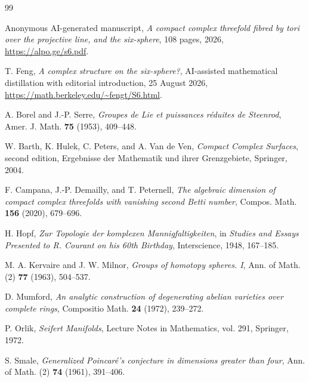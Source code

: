 \documentclass[11pt,reqno]{amsart}
\numberwithin{equation}{section}
\theoremstyle{definition}
\begin{document}
\begin{thebibliography}{99}

Anonymous AI-generated manuscript,
\emph{A compact complex threefold fibred by tori over the projective line, and the six-sphere},
108 pages, 2026,
\url{https://alpo.ge/s6.pdf}.

T. Feng,
\emph{A complex structure on the six-sphere?},
AI-assisted mathematical distillation with editorial introduction, 25 August 2026,
\url{https://math.berkeley.edu/~fengt/S6.html}.

A. Borel and J.-P. Serre,
\emph{Groupes de Lie et puissances r\'eduites de Steenrod},
Amer. J. Math. \textbf{75} (1953), 409--448.

W. Barth, K. Hulek, C. Peters, and A. Van de Ven,
\emph{Compact Complex Surfaces}, second edition,
Ergebnisse der Mathematik und ihrer Grenzgebiete, Springer, 2004.

F. Campana, J.-P. Demailly, and T. Peternell,
\emph{The algebraic dimension of compact complex threefolds with vanishing second Betti number},
Compos. Math. \textbf{156} (2020), 679--696.

H. Hopf,
\emph{Zur Topologie der komplexen Mannigfaltigkeiten},
in \emph{Studies and Essays Presented to R. Courant on his 60th Birthday},
Interscience, 1948, 167--185.

M. A. Kervaire and J. W. Milnor,
\emph{Groups of homotopy spheres. I},
Ann. of Math. (2) \textbf{77} (1963), 504--537.

D. Mumford,
\emph{An analytic construction of degenerating abelian varieties over complete rings},
Compositio Math. \textbf{24} (1972), 239--272.

P. Orlik,
\emph{Seifert Manifolds},
Lecture Notes in Mathematics, vol. 291, Springer, 1972.

S. Smale,
\emph{Generalized Poincar\'e's conjecture in dimensions greater than four},
Ann. of Math. (2) \textbf{74} (1961), 391--406.

\end{thebibliography}
\end{document}
